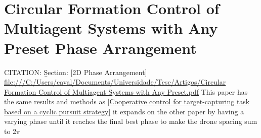 \section{Circular Formation Control of Multiagent Systems with Any Preset Phase Arrangement}

CITATION: \cite{electronics10232959} \b{Section: [2D Phase Arrangement]}
\url{file:///C:/Users/caval/Documents/Universidade/Tese/Artigos/Circular Formation Control of Multiagent Systems with Any Preset.pdf}
This paper has the same results and methods as \cite{KIM20071426}\ref{Cooperative control for target-capturing task based on a cyclic pursuit strategy} it expands on the other paper by having a varying phase until it reaches the final best phase to make the drone spacing sum to 2$\pi$
